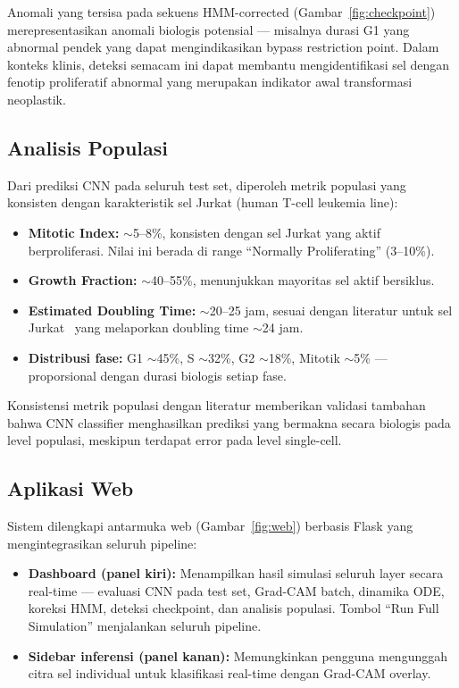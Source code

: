 \documentclass[conference]{IEEEtran}
\begin{document}
Anomali yang tersisa pada sekuens HMM-corrected (Gambar~\ref{fig:checkpoint}) merepresentasikan anomali biologis potensial --- misalnya durasi G1 yang abnormal pendek yang dapat mengindikasikan bypass restriction point. Dalam konteks klinis, deteksi semacam ini dapat membantu mengidentifikasi sel dengan fenotip proliferatif abnormal yang merupakan indikator awal transformasi neoplastik.

\subsection{Analisis Populasi}

Dari prediksi CNN pada seluruh test set, diperoleh metrik populasi yang konsisten dengan karakteristik sel Jurkat (human T-cell leukemia line):
\begin{itemize}[noitemsep,topsep=3pt]
    \item \textbf{Mitotic Index:} $\sim$5--8\%, konsisten dengan sel Jurkat yang aktif berproliferasi. Nilai ini berada di range ``Normally Proliferating'' (3--10\%).
    \item \textbf{Growth Fraction:} $\sim$40--55\%, menunjukkan mayoritas sel aktif bersiklus.
    \item \textbf{Estimated Doubling Time:} $\sim$20--25 jam, sesuai dengan literatur untuk sel Jurkat~\cite{eulenberg2017} yang melaporkan doubling time $\sim$24 jam.
    \item \textbf{Distribusi fase:} G1 $\sim$45\%, S $\sim$32\%, G2 $\sim$18\%, Mitotik $\sim$5\% --- proporsional dengan durasi biologis setiap fase.
\end{itemize}

Konsistensi metrik populasi dengan literatur memberikan validasi tambahan bahwa CNN classifier menghasilkan prediksi yang bermakna secara biologis pada level populasi, meskipun terdapat error pada level single-cell.

\subsection{Aplikasi Web}

Sistem dilengkapi antarmuka web (Gambar~\ref{fig:web}) berbasis Flask yang mengintegrasikan seluruh pipeline:
\begin{itemize}[noitemsep,topsep=3pt]
    \item \textbf{Dashboard (panel kiri):} Menampilkan hasil simulasi seluruh layer secara real-time --- evaluasi CNN pada test set, Grad-CAM batch, dinamika ODE, koreksi HMM, deteksi checkpoint, dan analisis populasi. Tombol ``Run Full Simulation'' menjalankan seluruh pipeline.
    \item \textbf{Sidebar inferensi (panel kanan):} Memungkinkan pengguna mengunggah citra sel individual untuk klasifikasi real-time dengan Grad-CAM overlay.
\end{itemize}
\end{document}
